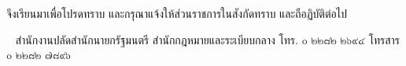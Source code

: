 \documentclass[a4paper, oneside]{article}
\begin{document}
	จึงเรียนมาเพื่อโปรดทราบ และกรุณาแจ้งให้ส่วนราชการในสังกัดทราบ และถือฏิบัติต่อไป
	
	\vskip 12pt

	\makebox[5.5cm][l]{}
	
	\
	\newline
	\makebox[8.0cm][l]{}
	\newline
	\makebox[8.0cm][l]{}
	\newline
	สำนักงานปลัดสำนักนายกรัฐมนตรี
	\newline
	สำนักกฎหมายและระเบียบกลาง
	\newline
	โทร. ๐ ๒๒๘๒ ๒๖๙๔ โทรสาร ๐ ๒๒๘๒ ๗๘๙๖
	
\end{document}
